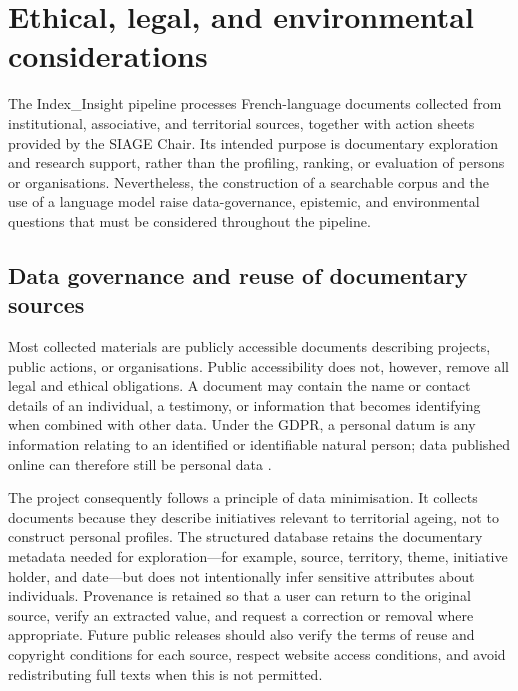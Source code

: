 
\section{Ethical, legal, and environmental considerations}

The Index\_Insight pipeline processes French-language documents collected from
institutional, associative, and territorial sources, together with action sheets
provided by the SIAGE Chair. Its intended purpose is documentary exploration and
research support, rather than the profiling, ranking, or evaluation of persons
or organisations. Nevertheless, the construction of a searchable corpus and the
use of a language model raise data-governance, epistemic, and environmental
questions that must be considered throughout the pipeline.

\subsection{Data governance and reuse of documentary sources}

Most collected materials are publicly accessible documents describing projects,
public actions, or organisations. Public accessibility does not, however, remove
all legal and ethical obligations. A document may contain the name or contact
details of an individual, a testimony, or information that becomes identifying
when combined with other data. Under the GDPR, a personal datum is any
information relating to an identified or identifiable natural person; data
published online can therefore still be personal data \cite{cnil2024reuse}.

The project consequently follows a principle of data minimisation. It collects
documents because they describe initiatives relevant to territorial ageing, not
to construct personal profiles. The structured database retains the documentary
metadata needed for exploration---for example, source, territory, theme,
initiative holder, and date---but does not intentionally infer sensitive
attributes about individuals. Provenance is retained so that a user can return
to the original source, verify an extracted value, and request a correction or
removal where appropriate. Future public releases should also verify the terms
of reuse and copyright conditions for each source, respect website access
conditions, and avoid redistributing full texts when this is not permitted.

